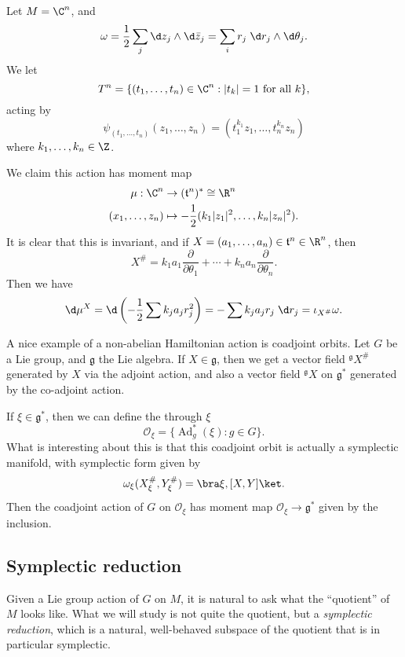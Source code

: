 \documentclass[a4paper]{article}
\DeclareMathOperator{\Ad}{Ad}
\begin{document}
\begin{eg}
  Let $M = \C^n$, and
  \[
    \omega = \frac{1}{2} \sum_j \d z_j \wedge \d \bar{z}_j = \sum_i r_j \;\d r_j \wedge \d \theta_j.
  \]
  We let
  \[
    T^n = \{(t_1, \ldots, t_n) \in \C^n : |t_k| = 1\text{ for all }k\},
  \]
  acting by
  \[
    \psi_{(t_1, \ldots, t_n)}(z_1, \ldots, z_n) = (t_1^{k_1}z_1, \ldots, t_n^{k_n} z_n)
  \]
  where $k_1, \ldots, k_n \in \Z$.

  We claim this action has moment map
  \begin{align*}
    \mu: \C^n &\to (\mathfrak{t}^n)^* \cong \R^n\\
    (x_1,\ldots, z_n) &\mapsto - \frac{1}{2} (k_1 |z_1|^2, \ldots, k_n |z_n|^2).
  \end{align*}
  It is clear that this is invariant, and if $X = (a_1, \ldots, a_n) \in \mathfrak{t}^n \in \R^n$, then
  \[
    X^\# = k_1 a_1 \frac{\partial}{\partial \theta_1} + \cdots + k_n a_n \frac{\partial}{\partial \theta_n}.
  \]
  Then we have
  \[
    \d \mu^X = \d \left(-\frac{1}{2} \sum k_j a_j r_j^2\right) = - \sum k_j a_j r_j \;\d r_j = \iota_{X^\#} \omega.
  \]
\end{eg}

\begin{eg}
  A nice example of a non-abelian Hamiltonian action is coadjoint orbits. Let $G$ be a Lie group, and $\mathfrak{g}$ the Lie algebra. If $X \in \mathfrak{g}$, then we get a vector field $^{\mathfrak{g}} X^\#$ generated by $X$ via the adjoint action, and also a vector field $^{\mathfrak{g}}X$ on $\mathfrak{g}^*$ generated by the co-adjoint action.

  If $\xi \in \mathfrak{g}^*$, then we can define the  through $\xi$
  \[
    \mathcal{O}_\xi = \{ \Ad_g^*(\xi) : g \in G\}.
  \]
  What is interesting about this is that this coadjoint orbit is actually a symplectic manifold, with symplectic form given by
  \[
    \omega_\xi (X_\xi^{\#}, Y_{\xi}^{\#}) = \bra \xi, [X, Y]\ket.
  \]
  Then the coadjoint action of $G$ on $\mathcal{O}_\xi$ has moment map $\mathcal{O}_\xi \to \mathfrak{g}^*$ given by the inclusion.
\end{eg}

\subsection{Symplectic reduction}
Given a Lie group action of $G$ on $M$, it is natural to ask what the ``quotient'' of $M$ looks like. What we will study is not quite the quotient, but a \emph{symplectic reduction}, which is a natural, well-behaved subspace of the quotient that is in particular symplectic.
\end{document}
